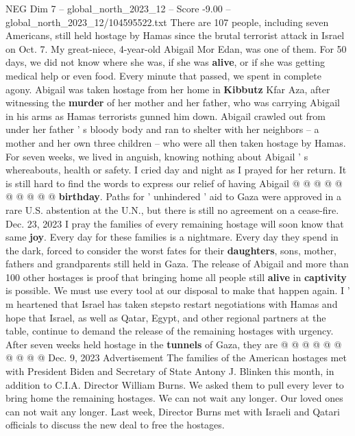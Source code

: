 \begin{textsample}{NEG Dim 7 – global\_north\_2023\_12 – Score -9.00 – global\_north\_2023\_12/104595522.txt}  \label{ex:f7_neg_146}
There are 107 people, including seven Americans, still held hostage by Hamas since the brutal terrorist attack in Israel on Oct. 7.
My great-niece, 4-year-old Abigail Mor Edan, was one of them.
For 50 days, we did not know where she was, if she was \textbf{alive}, or if she was getting medical help or even food.
Every minute that passed, we spent in complete agony.
Abigail was taken hostage from her home in \textbf{Kibbutz} Kfar Aza, after witnessing the \textbf{murder} of her mother and her father, who was carrying Abigail in his arms as Hamas terrorists gunned him down.
Abigail crawled out from under her father ' s bloody body and ran to shelter with her neighbors -- a mother and her own three children -- who were all then taken hostage by Hamas.
For seven weeks, we lived in anguish, knowing nothing about Abigail ' s whereabouts, health or safety.
I cried day and night as I prayed for her return.
It is still hard to find the words to express our relief of having Abigail @ @ @ @ @ @ @ @ @ @ \textbf{birthday}.
Paths for ' unhindered ' aid to Gaza were approved in a rare U.S. abstention at the U.N., but there is still no agreement on a cease-fire.
Dec. 23, 2023 I pray the families of every remaining hostage will soon know that same \textbf{joy}.
Every day for these families is a nightmare.
Every day they spend in the dark, forced to consider the worst fates for their \textbf{daughters}, sons, mother, fathers and grandparents still held in Gaza.
The release of Abigail and more than 100 other hostages is proof that bringing home all people still \textbf{alive} in \textbf{captivity} is possible.
We must use every tool at our disposal to make that happen again.
I ' m heartened that Israel has taken stepsto restart negotiations with Hamas and hope that Israel, as well as Qatar, Egypt, and other regional partners at the table, continue to demand the release of the remaining hostages with urgency.
After seven weeks held hostage in the \textbf{tunnels} of Gaza, they are @ @ @ @ @ @ @ @ @ @ Dec. 9, 2023 Advertisement The families of the American hostages met with President Biden and Secretary of State Antony J.
Blinken this month, in addition to C.I.A.
Director William Burns.
We asked them to pull every lever to bring home the remaining hostages.
We can not wait any longer.
Our loved ones can not wait any longer.
Last week, Director Burns met with Israeli and Qatari officials to discuss the new deal to free the hostages.

\end{textsample}
